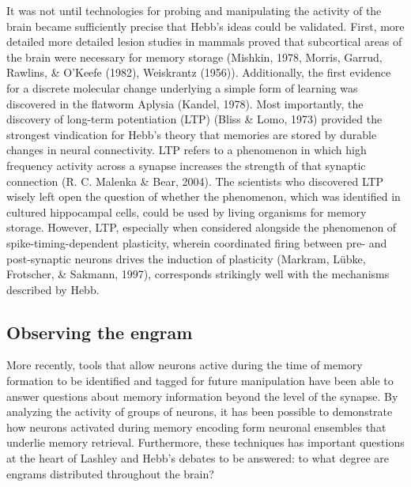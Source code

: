 \documentclass[12pt,a4paperpaper,]{report}
\begin{document}
It was not until technologies for probing and manipulating the activity
of the brain became sufficiently precise that Hebb's ideas could be
validated. First, more detailed more detailed lesion studies in mammals
proved that subcortical areas of the brain were necessary for memory
storage (Mishkin, 1978, Morris, Garrud, Rawlins, \& O'Keefe (1982),
Weiskrantz (1956)). Additionally, the first evidence for a discrete
molecular change underlying a simple form of learning was discovered in
the flatworm Aplysia (Kandel, 1978). Most importantly, the discovery of
long-term potentiation (LTP) (Bliss \& Lomo, 1973) provided the
strongest vindication for Hebb's theory that memories are stored by
durable changes in neural connectivity. LTP refers to a phenomenon in
which high frequency activity across a synapse increases the strength of
that synaptic connection (R. C. Malenka \& Bear, 2004). The scientists
who discovered LTP wisely left open the question of whether the
phenomenon, which was identified in cultured hippocampal cells, could be
used by living organisms for memory storage. However, LTP, especially
when considered alongside the phenomenon of spike-timing-dependent
plasticity, wherein coordinated firing between pre- and post-synaptic
neurons drives the induction of plasticity (Markram, Lübke, Frotscher,
\& Sakmann, 1997), corresponds strikingly well with the mechanisms
described by Hebb.

\subsection{Observing the engram}\label{observing-the-engram}

More recently, tools that allow neurons active during the time of memory
formation to be identified and tagged for future manipulation have been
able to answer questions about memory information beyond the level of
the synapse. By analyzing the activity of groups of neurons, it has been
possible to demonstrate how neurons activated during memory encoding
form neuronal ensembles that underlie memory retrieval. Furthermore,
these techniques has important questions at the heart of Lashley and
Hebb's debates to be answered: to what degree are engrams distributed
throughout the brain?
\end{document}
